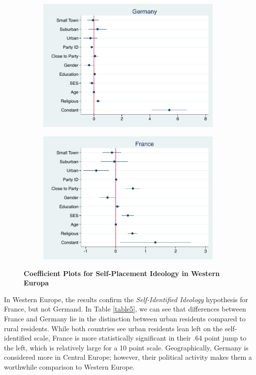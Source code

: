 \documentclass[12pt, titlepage]{article}
\newcommand\e{\emph}
\newcommand\tb{\textbf}
\begin{document}
\begin{figure}[H]
	\centering
	\begin{subfigure}[b]{0.475\textwidth}
		\centering
		\includegraphics[width=\textwidth]{IdeologyCoef/Germany}
	\end{subfigure}
	\hfill
	\begin{subfigure}[b]{0.475\textwidth}  
		\centering 
		\includegraphics[width=\textwidth]{IdeologyCoef/France}
	\end{subfigure}
	\caption[ \tb{Self-Placement Ideology - Western Europe} ]
	{\tb {Coefficient Plots for Self-Placement Ideology in Western Europa} }
	\label{WestEuro}
\end{figure}

In Western Europe, the results confirm the \e{Self-Identified Ideology} hypothesis for France, but not Germand. In Table \ref{table5}, we can see that differences between France and Germany lie in the distinction between urban residents compared to rural residents. While both countries see urban residents lean left on the self-identified scale, France is more statistically significant in their .64 point jump to the left, which is relatively large for a 10 point scale. Geographically, Germany is considered more in Central Europe; however, their political activity makes them a worthwhile comparison to Western Europe.
\end{document}
